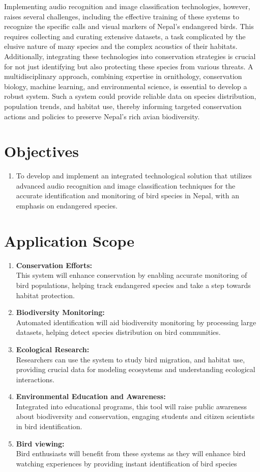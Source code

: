 Implementing audio recognition and image classification technologies, however, raises several challenges, including the effective training of these systems to recognize the specific calls and visual markers of Nepal's endangered birds. This requires collecting and curating extensive datasets, a task complicated by the elusive nature of many species and the complex acoustics of their habitats. Additionally, integrating these technologies into conservation strategies is crucial for not just identifying but also protecting these species from various threats. A multidisciplinary approach, combining expertise in ornithology, conservation biology, machine learning, and environmental science, is essential to develop a robust system. Such a system could provide reliable data on species distribution, population trends, and habitat use, thereby informing targeted conservation actions and policies to preserve Nepal's rich avian biodiversity.

\section{Objectives}
\begin{enumerate}[label=\roman*]
    \item To develop and implement an integrated technological solution that utilizes advanced audio recognition and image classification techniques for the accurate identification and monitoring of bird species in Nepal, with an emphasis on endangered species.
\end{enumerate}

\section{Application Scope}
 \begin{enumerate}
    \item \textbf{Conservation Efforts:}\\This system will enhance conservation by enabling accurate monitoring 
    of bird populations, helping track endangered species and take a step towards habitat protection.
    \item \textbf{Biodiversity Monitoring:}\\Automated identification will aid biodiversity monitoring by 
    processing large datasets, helping detect species distribution on bird communities.
    \item \textbf{Ecological Research:}\\ Researchers can use the system to study bird migration,
     and habitat use, providing crucial data for modeling ecosystems and understanding ecological interactions.
    \item \textbf{Environmental Education and Awareness:}\\Integrated into educational programs, this tool will 
    raise public awareness about biodiversity and conservation, engaging students and citizen scientists in bird identification.
    \item \textbf{Bird viewing:}\\Bird enthusiasts will benefit from these systems as they will enhance bird watching experiences by providing instant identification of bird species
 \end{enumerate}
